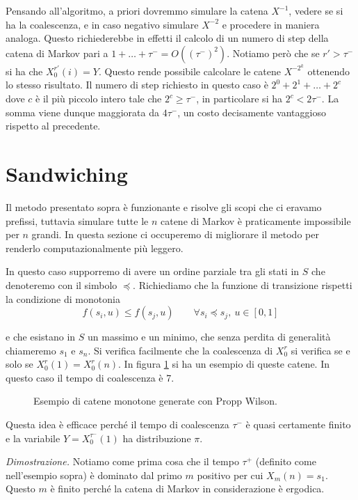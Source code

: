 \documentclass[]{marticle}
\begin{document}
Pensando all'algoritmo, a priori dovremmo simulare la catena $X^{-1}$, vedere se
si ha la coalescenza, e in caso negativo simulare $X^{-2}$ e procedere in
maniera analoga. Questo richiederebbe in effetti il calcolo di un numero di step
della catena di Markov pari a $1+\dots+\tau^- = O((\tau^-)^2)$. Notiamo per\`o
che se $r'>\tau^-$ si ha che $X^{r'}_0(i) = Y$. Questo rende possibile calcolare
le catene $X^{-2^k}$ ottenendo lo stesso risultato. Il numero di step richiesto
in questo caso \`e $2^0+2^1 + \dots + 2^c$ dove $c$ \`e il pi\`u piccolo intero
tale che $2^c \geq \tau^-$, in particolare si ha $2^c < 2\tau^-$. La somma viene
dunque maggiorata da $4\tau^-$, un costo decisamente vantaggioso rispetto al
precedente.

\section{Sandwiching}

Il metodo presentato sopra \`e funzionante e risolve gli scopi che ci eravamo
prefissi, tuttavia simulare tutte le $n$ catene di Markov \`e praticamente
impossibile per $n$ grandi. In questa sezione ci occuperemo di migliorare il
metodo per renderlo computazionalmente pi\`u leggero.
 
In questo caso supporremo di avere un ordine parziale tra gli stati in $S$ che
denoteremo con il simbolo $\preceq$. Richiediamo che la funzione di transizione
rispetti la condizione di monotonia
\[
    f(s_i, u) \leq f(s_j, u) \qquad \forall s_i \preceq s_j,\ u \in [0,1]
\]

e che esistano in $S$ un massimo e un minimo, che senza perdita di generalit\`a
chiameremo $s_1$ e $s_n$. Si verifica facilmente che la coalescenza di $X^r_0$
si verifica se e solo se $X^r_0(1) = X^r_0(n)$. In figura \ref{fig:im2} si ha un
esempio di queste catene. In questo caso il tempo di coalescenza \`e 7.

\begin{figure}[h!]

\caption{Esempio di catene monotone generate con Propp Wilson.}
\label{fig:im2}
\centering
\end{figure}

Questa idea \`e efficace perch\'e il tempo di coalescenza $\tau^-$ \`e quasi
certamente finito e la variabile $Y=X^{\tau^-}_0(1)$ ha distribuzione $\pi$.

\textit{Dimostrazione.}\cite{bremaud} Notiamo come prima cosa che il tempo
$\tau^+$ (definito come nell'esempio sopra) \`e dominato dal primo $m$ positivo
per cui $X_m(n) = s_1$. Questo $m$ \`e finito perch\'e la catena di Markov in
considerazione \`e ergodica. 
\end{document}
